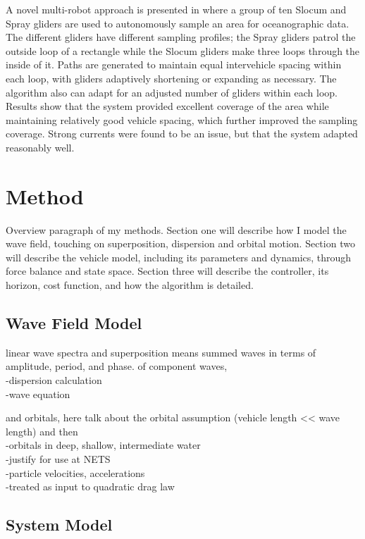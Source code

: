 \documentclass[double,12pt]{beavtex}
\begin{document}
A novel multi-robot approach is presented in \cite{leonard} where a group of ten Slocum and Spray gliders are used to autonomously sample an area for oceanographic data. The different gliders have different sampling profiles; the Spray gliders patrol the outside loop of a rectangle while the Slocum gliders make three loops through the inside of it. Paths are generated to maintain equal intervehicle spacing within each loop, with gliders adaptively shortening or expanding as necessary. The algorithm also can adapt for an adjusted number of gliders within each loop. Results show that the system provided excellent coverage of the area while maintaining relatively good vehicle spacing, which further improved the sampling coverage. Strong currents were found to be an issue, but that the system adapted reasonably well. 



\chapter{Method}

Overview paragraph of my methods. Section one will describe how I model the wave field, touching on superposition, dispersion and orbital motion. Section two will describe the vehicle model, including its parameters and dynamics, through force balance and state space. Section three will describe the controller, its horizon, cost function, and how the algorithm is detailed.

\section{Wave Field Model}

linear wave spectra and superposition means summed waves in terms of amplitude, period, and phase. of component waves,
\\	-dispersion calculation
\\	-wave equation

and orbitals, here talk about the orbital assumption (vehicle length << wave length) and then
\\	-orbitals in deep, shallow, intermediate water
\\	-justify for use at NETS
\\	-particle velocities, accelerations
\\	-treated as input to quadratic drag law


\section{System Model}
\end{document}
